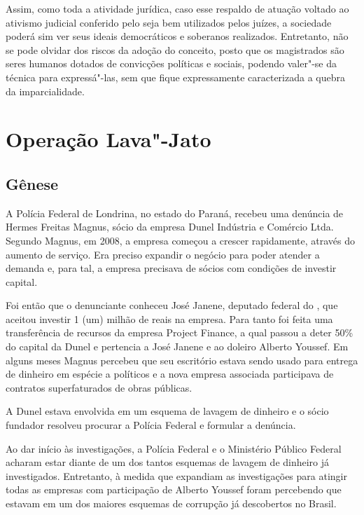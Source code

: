 Assim, como toda a atividade jurídica, caso esse respaldo de atuação
voltado ao ativismo judicial conferido pelo  seja bem utilizados
pelos juízes, a sociedade poderá sim ver seus ideais democráticos e
soberanos realizados. Entretanto, não se pode olvidar dos riscos da
adoção do conceito, posto que os magistrados são seres humanos dotados
de convicções políticas e sociais, podendo valer"-se da técnica para
expressá"-las, sem que fique expressamente caracterizada a quebra da
imparcialidade.

\section{Operação Lava"-Jato}

\subsection{Gênese}

A Polícia Federal de Londrina, no estado do Paraná, recebeu uma denúncia
de Hermes Freitas Magnus, sócio da empresa Dunel Indústria e Comércio
Ltda. Segundo Magnus, em 2008, a empresa começou a crescer rapidamente,
através do aumento de serviço. Era preciso expandir o negócio para poder
atender a demanda e, para tal, a empresa precisava de sócios com
condições de investir capital.

Foi então que o denunciante conheceu José Janene, deputado federal do
, que aceitou investir 1 (um) milhão de reais na empresa. Para tanto
foi feita uma transferência de recursos da empresa  Project Finance,
a qual passou a deter 50\% do capital da Dunel e pertencia a José Janene
e ao doleiro Alberto Youssef. Em alguns meses Magnus percebeu que seu
escritório estava sendo usado para entrega de dinheiro em espécie a
políticos e a nova empresa associada participava de contratos
superfaturados de obras públicas.

A Dunel estava envolvida em um esquema de lavagem de dinheiro e o sócio
fundador resolveu procurar a Polícia Federal e formular a denúncia.

Ao dar início às investigações, a Polícia Federal e o Ministério Público
Federal acharam estar diante de um dos tantos esquemas de lavagem de
dinheiro já investigados. Entretanto, à medida que expandiam as
investigações para atingir todas as empresas com participação de Alberto
Youssef foram percebendo que estavam em um dos maiores esquemas de
corrupção já descobertos no Brasil.

